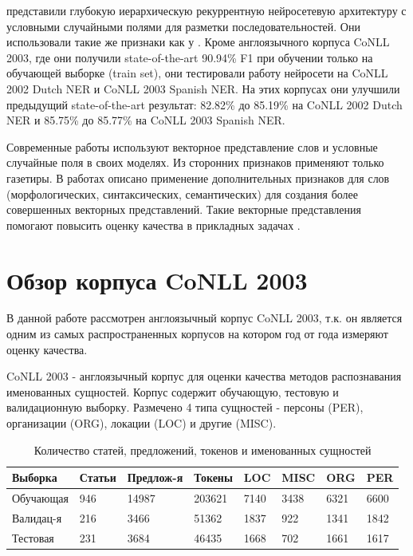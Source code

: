     \citep{DBLP:journals/corr/YangSC16} представили глубокую иерархическую рекуррентную нейросетевую
    архитектуру с условными случайными полями для разметки последовательностей.
    Они использовали такие же признаки как у \citep{collobert2011natural}.
    Кроме англоязычного корпуса CoNLL 2003, где они получили state-of-the-art 90.94\% F1 при обучении
    только на обучающей выборке (train set), они тестировали работу нейросети на CoNLL 2002 Dutch NER и CoNLL 2003 Spanish NER.
    На этих корпусах они улучшили предыдущий state-of-the-art результат:
    82.82\% до 85.19\% на CoNLL 2002 Dutch NER и 85.75\% до 85.77\% на CoNLL 2003 Spanish NER.

    Современные работы используют векторное представление слов
    и условные случайные поля в своих моделях. Из сторонних признаков применяют
    только газетиры. В работах \citep{xu2014rc, bian2014knowledge} описано применение дополнительных признаков для
    слов (морфологических, синтаксических, семантических) для создания более
    совершенных векторных представлений.
    Такие векторные представления помогают повысить оценку качества в
    прикладных задачах \citep{xu2014rc}.

  \section{Обзор корпуса CoNLL 2003}

  В данной работе рассмотрен англоязычный корпус CoNLL 2003, т.к. он является
  одним из самых распространенных корпусов на котором год от года измеряют оценку качества.

  CoNLL 2003 \citep{tjong2003introduction} - англоязычный корпус для оценки качества
  методов распознавания именованных сущностей.
  Корпус содержит обучающую, тестовую и валидационную выборку.
  Размечено 4 типа сущностей - персоны (PER), организации (ORG), локации (LOC) и другие (MISC).
  \newpage
  \begin{table}[!h]
    \caption{Количество статей, предложений, токенов и именованных сущностей}
    \centering
    \begin{tabular}{ | p{2.9cm} | p{1.5cm} | p{2.5cm} | p{1.5cm} | p{1cm} | p{1.1cm} | p{1cm}| p{1cm} |}
      \hline\hline
      Выборка & Статьи & Предлож-я & Токены & LOC & MISC & ORG & PER \\
      \hline
      Обучающая & 946 & 14987 & 203621 & 7140 & 3438 & 6321 & 6600 \\
      \hline
      Валидац-я & 216 & 3466 & 51362 & 1837 & 922 & 1341 & 1842 \\
      \hline
      Тестовая & 231 & 3684 & 46435 & 1668 & 702 & 1661 & 1617 \\
      \hline
    \end{tabular}
  \end{table}

